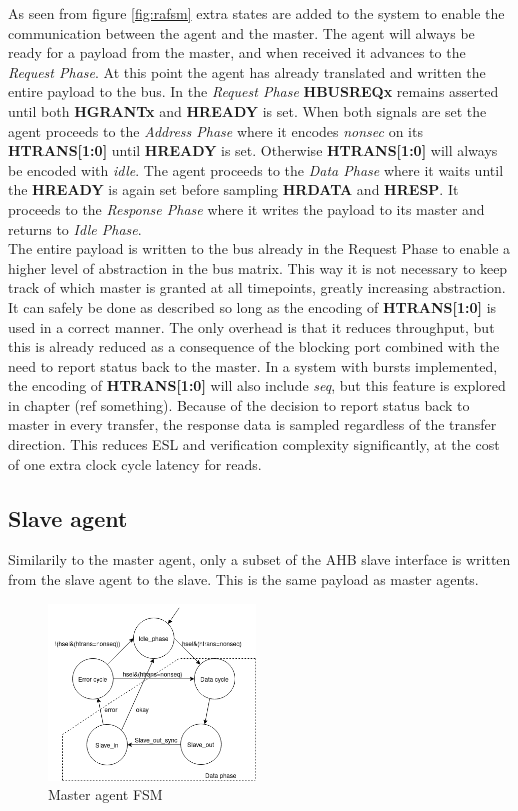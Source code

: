 As seen from figure \ref{fig:rafsm} extra states are added to the system to enable the communication between the agent and the master. The agent will always be ready for a payload from the master, and when received it advances to the \textit{Request Phase}. At this point the agent has already translated and written the entire payload to the bus. In the \textit{Request Phase} \textbf{HBUSREQx} remains asserted until both \textbf{HGRANTx} and \textbf{HREADY} is set. When both signals are set the agent proceeds to the \textit{Address Phase} where it encodes \textit{nonsec} on its \textbf{HTRANS[1:0]} until \textbf{HREADY} is set. Otherwise \textbf{HTRANS[1:0]} will always be encoded with \textit{idle}. The agent proceeds to the \textit{Data Phase} where it waits until the \textbf{HREADY} is again set before sampling \textbf{HRDATA} and \textbf{HRESP}. It proceeds to the \textit{Response Phase} where it writes the payload to its master and returns to \textit{Idle Phase}. \\
\newline
The entire payload is written to the bus already in the Request Phase to enable a higher level of abstraction in the bus matrix. This way it is not necessary to keep track of which master is granted at all timepoints, greatly increasing abstraction. It can safely be done as described so long as the encoding of \textbf{HTRANS[1:0]} is used in a correct manner. The only overhead is that it reduces throughput, but this is already reduced as a consequence of the blocking port combined with the need to report status back to the master. In a system with bursts implemented, the encoding of \textbf{HTRANS[1:0]} will also include \textit{seq}, but this feature is explored in chapter (ref something). Because of the decision to report status back to master in every transfer, the response data is sampled regardless of the transfer direction. This reduces ESL and verification complexity significantly, at the cost of one extra clock cycle latency for reads. 

\subsection{Slave agent}
Similarily to the master agent, only a subset of the AHB slave interface is written from the slave agent to the slave. This is the same payload as master agents. 

\begin{figure}
\includegraphics[width=5.5cm]{figs/hw/sAgent_FSM.png}
\caption{Master agent FSM}\label{fig:rsfsm}
\end{figure}  

